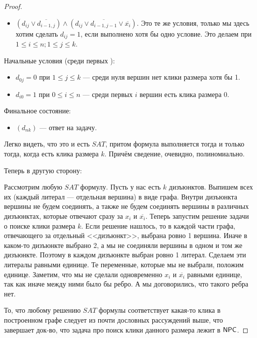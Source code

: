 \documentclass[a4paper, 12pt]{article}
\begin{document}
\begin{proof}
\begin{itemize}
    \item $(d_{ij} \vee \overline{d_{i - 1, j}}) \wedge (d_{ij}
    \vee \overline{d_{i - 1, j - 1}} \vee \overline{x_i})$. Это те же условия,
    только мы здесь хотим сделать $d_{ij} = 1$, если выполнено хотя бы одно
    условие. Это делаем при $1 \leqslant i \leqslant n; 1 \leqslant j \leqslant k$.
  \end{itemize}

  Начальные условия (среди первых ):

  \begin{itemize}
    \item $d_{0j} = 0$ при $1 \leqslant j \leqslant k$ --- среди нуля вершин
    нет клики размера хотя бы 1.
    \item $d_{i0} = 1$ при $0 \leqslant i \leqslant n$ --- среди первых
    $i$ вершин есть клика размера 0.
  \end{itemize}

  Финальное состояние:

  \begin{itemize}
    \item $(d_{nk})$ --- ответ на задачу.
  \end{itemize}

  Легко видеть, что это и есть $SAT$, притом формула выполняется тогда и только
  тогда, когда есть клика размера $k$. Причём сведение, очевидно, полиномиально.

  Теперь в другую сторону:

  Рассмотрим любую $SAT$ формулу. Пусть у нас есть $k$ дизъюнктов.
  Выпишем всех их (каждый литерал --- отдельная вершина) в виде графа.
  Внутри дизъюнкта вершины не будем соединять,
  а также не будем соединять вершины в различных дизъюнктах, которые отвечают
  сразу за $x_i$ и $\overline{x_i}$. Теперь запустим решение задачи о поиске
  клики размера $k$. Если решение нашлось, то в каждой части графа, отвечающего
  за отдельный <<дизъюнкт>>, выбрана ровно 1 вершина. Иначе в каком-то дизъюнкте
  выбрано 2, а мы не соединяли вершины в одном и том же дизъюнкте. Поэтому
  в каждом дизъюнкте выбран ровно 1 литерал. Сделаем эти литералы равными единице.
  Те переменные, которые мы не выбрали, положим единице. Заметим, что мы
  не сделали одновременно $x_i$ и $\overline{x_i}$ равными единице, так как
  иначе между ними было бы ребро. А мы договорились, что такого ребра нет.

  То, что любому решению $SAT$ формулы соответствует какая-то клика в построенном
  графе следует из почти дословных рассуждений выше, что завершает док-во, что
  задача про поиск клики данного размера лежит в $\mathsf{NPC}$.
\end{proof}
\end{document}
